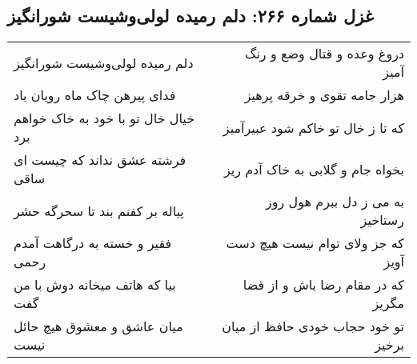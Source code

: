 \begin{center}
\section*{غزل شماره ۲۶۶: دلم رمیده لولی‌وشیست شورانگیز}
\label{sec:sh266}
\begin{longtable}{l p{0.5cm} r}
دلم رمیده لولی‌وشیست شورانگیز
&&
دروغ وعده و قتال وضع و رنگ آمیز
\\
فدای پیرهن چاک ماه رویان باد
&&
هزار جامه تقوی و خرقه پرهیز
\\
خیال خال تو با خود به خاک خواهم برد
&&
که تا ز خال تو خاکم شود عبیرآمیز
\\
فرشته عشق نداند که چیست ای ساقی
&&
بخواه جام و گلابی به خاک آدم ریز
\\
پیاله بر کفنم بند تا سحرگه حشر
&&
به می ز دل ببرم هول روز رستاخیز
\\
فقیر و خسته به درگاهت آمدم رحمی
&&
که جز ولای توام نیست هیچ دست آویز
\\
بیا که هاتف میخانه دوش با من گفت
&&
که در مقام رضا باش و از قضا مگریز
\\
میان عاشق و معشوق هیچ حائل نیست
&&
تو خود حجاب خودی حافظ از میان برخیز
\\
\end{longtable}
\end{center}
